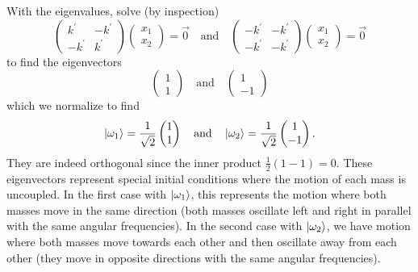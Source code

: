\documentclass[11pt]{article}
\begin{document}
\begin{enumerate}[label=(\alph*)]
    With the eigenvalues, solve (by inspection)
    \[\begin{pmatrix}
        k^{\prime} & -k^{\prime} \\
        -k^{\prime} & k^{\prime}
    \end{pmatrix}\begin{pmatrix}
        x_1 \\ x_2
    \end{pmatrix} = \vec{0}\quad \text{and}\quad \begin{pmatrix}
        -k^{\prime} & -k^{\prime} \\
        -k^{\prime} & -k^{\prime}
    \end{pmatrix}\begin{pmatrix}
        x_1 \\ x_2
    \end{pmatrix} = \vec{0}\]
    to find the eigenvectors \[\begin{pmatrix}
        1 \\ 1
    \end{pmatrix}\quad \text{and} \quad \begin{pmatrix}
        1 \\ -1
    \end{pmatrix}\]
    which we normalize to find 
    \[\ket{\omega_1} = \frac{1}{\sqrt{2}}\begin{pmatrix}
        1 \\ 1
    \end{pmatrix}\quad \text{and}\quad \ket{\omega_2} = \frac{1}{\sqrt{2}}\begin{pmatrix}
        1 \\ -1
    \end{pmatrix}.\]
    They are indeed orthogonal since the inner product $\frac{1}{2}(1-1) = 0$. These eigenvectors represent special initial conditions where the motion of each mass is uncoupled. In the first case with $\ket{\omega_1}$, this represents the motion where both masses move in the same direction (both masses oscillate left and right in parallel with the same angular frequencies). In the second case with $\ket{\omega_2}$, we have motion where both masses move towards each other and then oscillate away from each other (they move in opposite directions with the same angular frequencies).
\end{enumerate}
\end{document}

